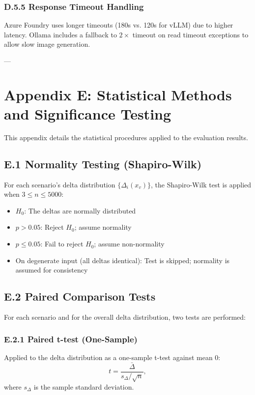 \subsubsection*{D.5.5 Response Timeout Handling}

Azure Foundry uses longer timeouts (180s vs. 120s for vLLM) due to higher latency. Ollama includes a fallback to $2 \times$ timeout on read timeout exceptions to allow slow image generation.

---

\section*{Appendix E: Statistical Methods and Significance Testing}

This appendix details the statistical procedures applied to the evaluation results.

\subsection*{E.1 Normality Testing (Shapiro-Wilk)}

For each scenario's delta distribution $\{\Delta_i(x_v)\}$, the Shapiro-Wilk test is applied when $3 \le n \le 5000$:

\begin{itemize}
    \item $H_0$: The deltas are normally distributed
    \item $p > 0.05$: Reject $H_0$; assume normality
    \item $p \le 0.05$: Fail to reject $H_0$; assume non-normality
    \item On degenerate input (all deltas identical): Test is skipped; normality is assumed for consistency
\end{itemize}

\subsection*{E.2 Paired Comparison Tests}

For each scenario and for the overall delta distribution, two tests are performed:

\subsubsection*{E.2.1 Paired t-test (One-Sample)}

Applied to the delta distribution as a one-sample t-test against mean 0:
\[
t = \frac{\bar{\Delta}}{s_\Delta / \sqrt{n}},
\]
where $s_\Delta$ is the sample standard deviation.

